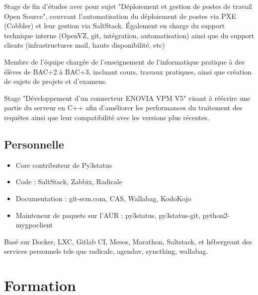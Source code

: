 \documentclass[10pt,a4paper]{moderncv}
\begin{document}
{Stage de fin d'études avec pour sujet "Déploiement et gestion de postes de
travail Open Source", couvrant l'automatisation du déploiement de postes via
PXE (Cobbler) et leur gestion via SaltStack. \'{E}galement en charge du support
technique interne (OpenVZ, git, intégration, automatisation) ainsi que du
support clients (infrastructures mail, haute disponibilité, etc)}

{Membre de l'équipe chargée de l'enseignement de l'informatique pratique à des
élèves de BAC+2 à BAC+3, incluant cours, travaux pratiques, ainsi que création
de sujets de projets et d'examens.}

{Stage "Développement d'un connecteur ENOVIA VPM V5" visant à réécrire une
partie du serveur en C++ afin d'améliorer les performances du traitement des
requêtes ainsi que leur compatibilité avec les versions plus récentes.}

\bigskip
\subsection{Personnelle}

{
  \begin{itemize}
    \item Core contributeur de Py3status
    \item Code : SaltStack, Zabbix, Radicale
    \item Documentation : git-scm.com, CAS, Wallabag, KodoKojo
    \item Mainteneur de paquets sur l'AUR : py3status, py3status-git,
      python2-mygpoclient
  \end{itemize}
}

{Basé sur Docker, LXC, Gitlab CI, Mesos, Marathon, Saltstack, et hébergeant des
services personnels tels que radicale, agendav, syncthing, wallabag.}

\section{Formation}

\end{document}
